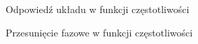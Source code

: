 \begin{figure}[H]
	\centering
	
	\caption{Odpowiedź układu w funkcji częstotliwości}
\end{figure}

\begin{figure}[H]
	\centering
	
	\caption{Przesunięcie fazowe w funkcji częstotliwości}
\end{figure}

